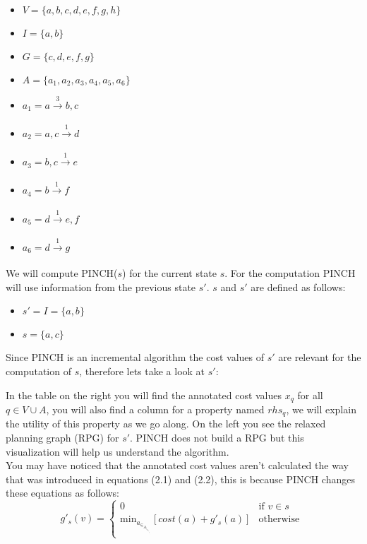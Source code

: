\begin{center}
\begin{multicols}{2}
\begin{itemize}
\setlength\itemsep{0em}
\item $V = \{a,b,c,d,e,f,g,h\}$
\item $I = \{a,b\}$
\item $G = \{c,d,e,f,g\}$ 
\item $A = \{a_1,a_2,a_3,a_4,a_5,a_6\}$
\item $a_1 = a \xrightarrow[\text{}]{\text{3}} b,c$
\item $a_2 = a,c \xrightarrow[\text{}]{\text{1}} d$
\item $a_3 = b,c \xrightarrow[\text{}]{\text{1}} e$
\item $a_4 = b \xrightarrow[\text{}]{\text{1}} f$
\item $a_5 = d \xrightarrow[\text{}]{\text{1}} e,f$
\item $a_6 = d \xrightarrow[\text{}]{\text{1}} g$
\end{itemize}
\end{multicols}
\end{center}
We will compute PINCH($s$) for the current state $s$. For the computation PINCH will use information from the previous state $s'$. $s$ and $s'$ are defined as follows: 
\begin{center}
\begin{multicols}{2}
\begin{itemize}
\setlength\itemsep{0em}
\item $s' = I = \{a,b\}$
\item $s = \{a,c\}$
\end{itemize}
\end{multicols}
\end{center}
Since PINCH is an incremental algorithm the cost values of $s'$ are relevant for the computation of $s$, therefore lets take a look at $s'$:

In the table on the right you will find the annotated cost values $x_q$ for all $q \in V \cup A$, you will also find a column for a property named $rhs_q$, we will explain the utility of this property as we go along. On the left you see the relaxed planning graph (RPG) for $s'$. PINCH does not build a RPG but this visualization will help us understand the algorithm.\\

You may have noticed that the annotated cost values aren't calculated the way that was introduced in equations (2.1) and (2.2), this is because PINCH changes these equations as follows:
\newpage
\begin{equation}
 g'_s(v) = 
  \begin{cases} 
   0 & \text{if } v \in s \\
   \text{min}_a_\in_A_|_v_\in_a_d_d_(_a_) [cost(a) + g'_s(a)]       & \text{otherwise } 
  \end{cases}
\end{equation}

